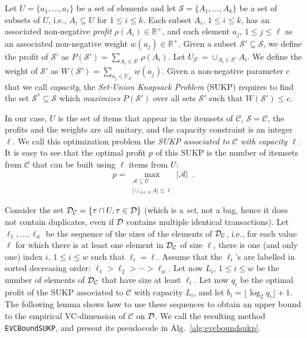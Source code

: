 \begin{definition}\label{def:sukp}
  Let $U=\{a_1,\dotsc,a_\ell\}$ be a set of elements and let
  $\mathcal{S}=\{A_1,\dotsc,A_k\}$ be a set of subsets of $U$, i.e.,
  $A_i\subseteq U$ for $1\le i\le k$. Each subset $A_i$, $1\le i\le k$, has an
  associated non-negative \emph{profit} $\rho(A_i)\in\mathbb{R}^+$, and each
  element $a_j$, $1\le j\le\ell$ as an associated non-negative weight
  $w(a_j)\in\mathbb{R}^+$.  Given a subset $\mathcal{S}'\subseteq\mathcal{S}$,
  we define the profit of $\mathcal{S}'$ as $P(\mathcal{S}')=\sum_{A_i\in
  \mathcal{S}'}\rho(A_i)$. Let $U_{\mathcal{S}'}=\cup_{A_i\in\mathcal{S}'}
  A_i$. We define the weight of $\mathcal{S}'$ as $W(\mathcal{S}')=\sum_{a_j\in
  U_{\mathcal{S}'}} w(a_j)$. Given a non-negative parameter $c$ that we call
  \emph{capacity}, the \emph{Set-Union Knapsack Problem} (SUKP) requires to find
  the set $\mathcal{S}^*\subseteq\mathcal{S}$ which \emph{maximizes}
  $P(\mathcal{S}')$ over all sets $\mathcal{S}'$ such that $W(\mathcal{S}')\le
  c$.
\end{definition}

In our case, $U$ is the set of items that appear in the itemsets of
$\mathcal{C}$, $\mathcal{S}=\mathcal{C}$, the profits and the weights are all
unitary, and the capacity constraint is an integer $\ell$. We call this
optimization problem the \emph{SUKP associated to $\mathcal{C}$ with capacity
$\ell$}. It is easy to see that the optimal profit $p$ of this SUKP is the
number of itemsets from $\mathcal{C}$ that can be built using $\ell$
items from $U$:
\[
	p=\max_{\substack{\mathcal{A}\subseteq\mathcal{C}\\ |\cup_{A\in\mathcal{A}}
A|\le\ell}} |\mathcal{A}|\enspace.
\]

Consider the set ${\cal D}_\mathcal{C} = \{ \tau \cap U, \tau\in {\cal D}\}$ (which is a
\emph{set}, not a bag, hence it does not contain duplicates, even if ${\cal D}$
contains multiple identical transactions). Let $\ell_1,\dotsc,\ell_w$ be the
sequence of the sizes of the elements of ${\cal D}_\mathcal{C}$, i.e., for each value
$\ell$ for which there is at least one element in ${\cal D}_\mathcal{C}$ of size
$\ell$, there is one (and only one) index $i$, $1\le i\le w$ such that
$\ell_i=\ell$. Assume that the $\ell_i$'s are labelled in sorted decreasing
order: $\ell_1>\ell_2>\dotsb>\ell_w$. Let now $L_i$, $1\le i\le w$ be the number
of elements of ${\cal D}_\mathcal{C}$ that have size at least $\ell_i$. %
Let now $q_i$ be the optimal profit of the SUKP associated to $\mathcal{C}$ with
capacity $L_i$, and let $b_i=\lfloor \log_2q_i\rfloor +1$. %
The following lemma shows how to use these sequences to obtain an upper bound
to the empirical VC-dimension of $\mathcal{C}$ on ${\cal D}$. We call the resulting
method \texttt{EVCBoundSUKP}, and present its pseudocode in
Alg.~\ref{alg:evcboundsukp}.

